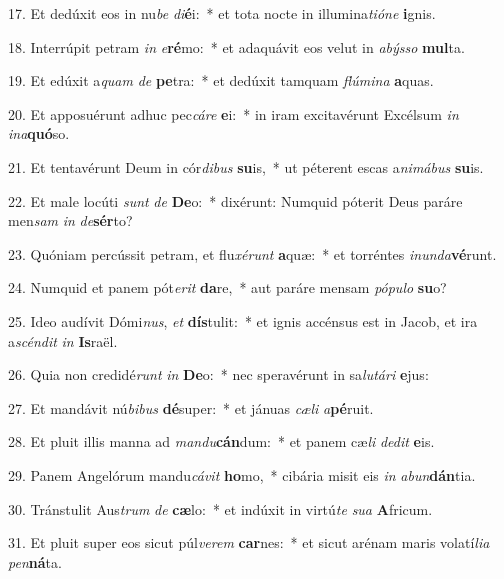 17. Et dedúxit eos in nu\textit{be} \textit{di}\textbf{é}i:~*  et tota nocte in illumina\textit{ti}\textit{ó}\textit{ne} \textbf{i}gnis.\

18. Interrúpit petram \textit{in} \textit{e}\textbf{ré}mo:~*  et adaquávit eos velut in \textit{a}\textit{býs}\textit{so} \textbf{mul}ta.\

19. Et edúxit a\textit{quam} \textit{de} \textbf{pe}tra:~*  et dedúxit tamquam \textit{flú}\textit{mi}\textit{na} \textbf{a}quas.\

20. Et apposuérunt adhuc pec\textit{cá}\textit{re} \textbf{e}i:~*  in iram excitavérunt Excélsum \textit{in} \textit{in}\textit{a}\textbf{quó}so.\

21. Et tentavérunt Deum in cór\textit{di}\textit{bus} \textbf{su}is,~*  ut péterent escas a\textit{ni}\textit{má}\textit{bus} \textbf{su}is.\

22. Et male locúti \textit{sunt} \textit{de} \textbf{De}o:~*  dixérunt: Numquid póterit Deus paráre men\textit{sam} \textit{in} \textit{de}\textbf{sér}to?\

23. Quóniam percússit petram, et flu\textit{xé}\textit{runt} \textbf{a}quæ:~*  et torréntes \textit{in}\textit{un}\textit{da}\textbf{vé}runt.\

24. Numquid et panem pót\textit{e}\textit{rit} \textbf{da}re,~*  aut paráre mensam \textit{pó}\textit{pu}\textit{lo} \textbf{su}o?\

25. Ideo audívit Dómi\textit{nus}, \textit{et} \textbf{dís}tulit:~*  et ignis accénsus est in Jacob, et ira a\textit{scén}\textit{dit} \textit{in} \textbf{Is}raël.\

26. Quia non credidé\textit{runt} \textit{in} \textbf{De}o:~*  nec speravérunt in sa\textit{lu}\textit{tá}\textit{ri} \textbf{e}jus:\

27. Et mandávit nú\textit{bi}\textit{bus} \textbf{dé}super:~*  et jánuas \textit{cæ}\textit{li} \textit{a}\textbf{pé}ruit.\

28. Et pluit illis manna ad \textit{man}\textit{du}\textbf{cán}dum:~*  et panem cæ\textit{li} \textit{de}\textit{dit} \textbf{e}is.\

29. Panem Angelórum mandu\textit{cá}\textit{vit} \textbf{ho}mo,~*  cibária misit eis \textit{in} \textit{ab}\textit{un}\textbf{dán}tia.\

30. Tránstulit Aus\textit{trum} \textit{de} \textbf{cæ}lo:~*  et indúxit in virtú\textit{te} \textit{su}\textit{a} \textbf{A}fricum.\

31. Et pluit super eos sicut púl\textit{ve}\textit{rem} \textbf{car}nes:~*  et sicut arénam maris volatí\textit{li}\textit{a} \textit{pen}\textbf{ná}ta.\

